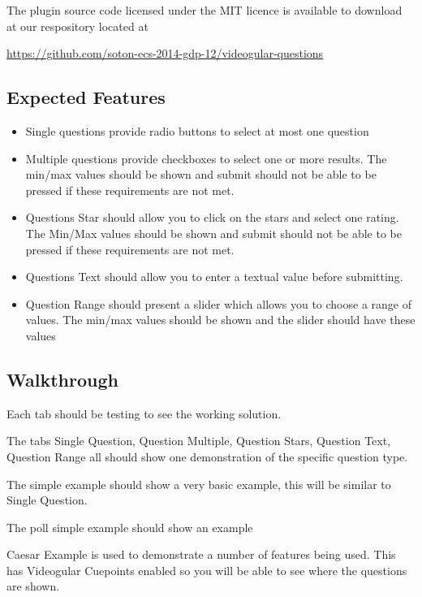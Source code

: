 \documentclass[12pt,a4paper]{article}
\begin{document}
The plugin source code licensed under the MIT licence is available to download at our respository located at 

\url{https://github.com/soton-ecs-2014-gdp-12/videogular-questions}

\subsection*{Expected Features}

\begin{itemize}
\item Single questions provide radio buttons to select at most one question
\item Multiple questions provide checkboxes to select one or more results. The min/max values should be shown and submit should not be able to be pressed if these requirements are not met.
\item Questions Star should allow you to click on the stars and select one rating. The Min/Max values should be shown and submit should not be able to be pressed if these requirements are not met.
\item Questions Text should allow you to enter a textual value before submitting.
\item Question Range should present a slider which allows you to choose a range of values. The min/max values should be shown and the slider should have these values
\end{itemize}

\subsection*{Walkthrough}

Each tab should be testing to see the working solution.

The tabs Single Question, Question Multiple, Question Stars, Question Text, Question Range all should show one demonstration of the specific question type.

The simple example should show a very basic example, this will be similar to Single Question.

The poll simple example should show an example 

Caesar Example is used to demonstrate a number of features being used. This has Videogular Cuepoints enabled so you will be able to see where the questions are shown.
\end{document}
